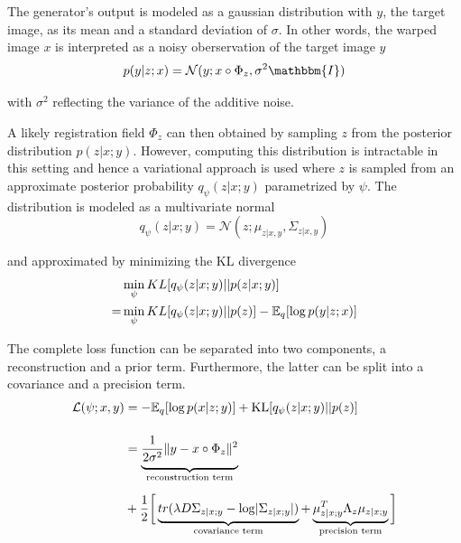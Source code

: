 The generator's output is modeled as a gaussian distribution with $y$, the target image, as its mean and a standard deviation of $\sigma$. In other words, the warped image $x$ is interpreted as a noisy oberservation of the target image $y$
\begin{equation}
	p(y|z;x) = \mathcal{N}(y; x \circ \Phi_z, \sigma^2 \mathbbm{I})
\end{equation}

with $\sigma^2$ reflecting the variance of the additive noise.

A likely registration field $\Phi_z$ can then obtained by sampling $z$ from the posterior distribution $p(z | x; y)$.
However, computing this distribution is intractable in this setting and hence a variational approach is used where $z$ is sampled from an approximate posterior probability $q_\psi(z | x; y)$ parametrized by $\psi$. The distribution is modeled as a multivariate normal
\begin{equation}
	q_\psi(z | x; y) = \mathcal{N}(z; \mu_{z | x, y}, \Sigma_{z | x, y})
\end{equation}

and approximated by minimizing the KL divergence
\begin{equation}
	\begin{split}
		  &\min_\psi KL [ q_\psi(z | x; y) || p(z | x; y) ] \\
		= &\min_\psi KL [ q_\psi(z | x; y) || p(z) ] - \mathbb{E}_q [ \log p(y | z; x) ]
	\end{split}
\end{equation}

The complete loss function can be separated into two components, a reconstruction and a prior term. Furthermore, the latter can be split into a covariance and a precision term.
\begin{equation} \label{eq:voxloss}
	\begin{split}
		\mathcal{L}(\psi; x, y)
		& = -\E_{q}[ \log p( x | z; y ) ]
		+ \text{KL} [ q_{\psi} ( z | x ; y ) || p ( z ) ] \\[12pt]
		& = \underbrace{
			\frac{1}{2 \sigma^2} \norm{y - x \circ \Phi_{z}}^{2} \vphantom{\frac{1}{2_{2_2}}}
		}_{\text{reconstruction term}} \\[6pt]
		& + \frac{1}{2} \bigg[
		\underbrace{
			tr( \lambda D \Sigma_{z | x; y} - \log \abs{ \Sigma_{z | x; y} } ) \vphantom{\mu_{z | x; y}^{T}}
		}_{\text{covariance term}} +
		\underbrace{
			\mu_{z | x; y}^{T} \Lambda_{z} \mu_{z | x; y}
		}_{\text{precision term}} \bigg]
	\end{split}
\end{equation}

